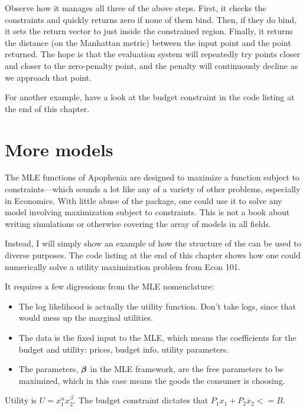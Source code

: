 Observe how it manages all three of the above steps. First, it checks
the constraints and quickly returns zero if none of them bind. Then, if
they do bind, it sets the return vector to just inside the constrained
region. Finally, it returns the distance (on the Manhattan metric)
between the input point and the point returned. The hope is that the
evaluation system will repeatedly try points closer and closer to the
zero-penalty point, and the penalty will continuously decline as we
approach that point.

For another example, have a look at the budget constraint in the code
listing at the end of this chapter.

\section{More models}    \label{econ101}

The MLE functions of Apophenia are designed to maximize a function
subject to constraints---which sounds a lot like any of a variety of
other problems, especially in Economics. With little abuse of the package,
one could use it to solve any model involving maximization
subject to constraints.  This is not a book about writing simulations
or otherwise covering the array of models in all fields.

Instead, I will simply show an example of how the structure of the
 can be used to diverse purposes.
The code listing at the end of this
chapter shows how one could numerically solve a utility maximization
problem from Econ 101. 

It requires a few digressions from the MLE nomenclature:
\begin{itemize}
\item The log likelihood is actually the utility function. Don't take logs,
since that would mess up the marginal utilities.

\item The data is the fixed input to the MLE, which means the
coefficients for the budget and utility:
prices, budget info, utility parameters.

\item The parameters, ${\mbox{\boldmath$\beta$}}$ in the MLE framework, are the free
parameters to be maximized, which in this case means the goods the
consumer is choosing.  \end{itemize}

Utility is $U = x_1^\alpha x_2^\beta$. 
The budget constraint dictates that $P_1 x_1 + P_2 x_2 <= B$.
                                                             
